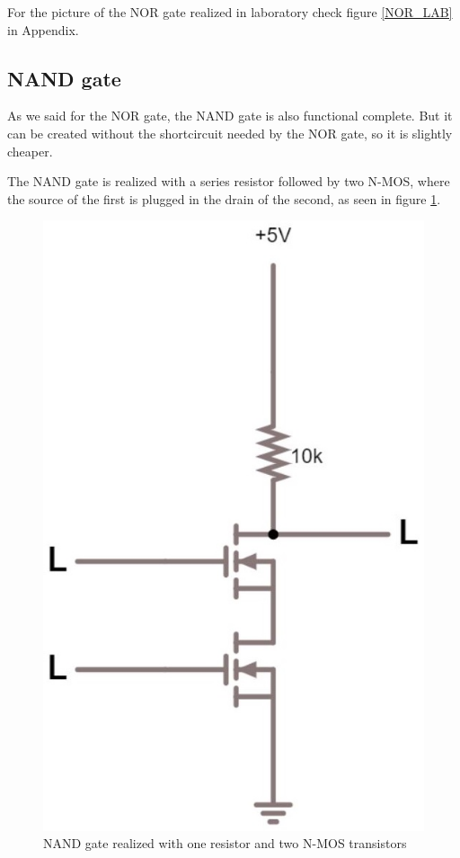 \documentclass{article}
\begin{document}
\vspace{3mm}

For the picture of the NOR gate realized in laboratory check figure \ref{NOR_LAB} in Appendix.



\subsection{NAND gate}

As we said for the NOR gate, the NAND gate is also functional complete. But it can be created without the shortcircuit needed by the NOR gate, so it is slightly cheaper. 

\vspace{3mm}

The NAND gate is realized with a series resistor followed by two N-MOS, where the source of the first is plugged in the drain of the second, as seen in figure \ref{NAND_NMOS}.

\begin{figure}[h]
    \centering
    \includegraphics[scale=.25]{IM_NAND_NMOS.JPG}
    \caption{NAND gate realized with one resistor and two N-MOS transistors}
    \label{NAND_NMOS}
\end{figure}
\end{document}

